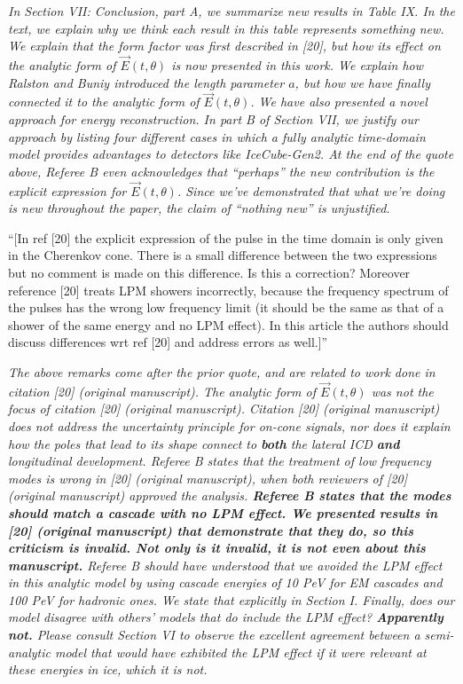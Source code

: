 \documentclass[12pt]{article}
\begin{document}
\textit{In Section VII: Conclusion, part A, we summarize new results in Table IX.  In the text, we explain why we think each result in this table represents something new.  We explain that the form factor was first described in [20], but how its effect on the analytic form of $\vec{E}(t,\theta)$ is now presented in this work.  We explain how Ralston and Buniy introduced the length parameter $a$, but how we have finally connected it to the analytic form of $\vec{E}(t,\theta)$. We have also presented a novel approach for energy reconstruction.  In part B of Section VII, we justify our approach by listing four different cases in which a fully analytic time-domain model provides advantages to detectors like IceCube-Gen2.  At the end of the quote above, Referee B even acknowledges that ``perhaps'' the new contribution is the explicit expression for $\vec{E}(t,\theta)$.  Since we've demonstrated that what we're doing is new throughout the paper, the claim of ``nothing new'' is unjustified.}

``[In ref [20] the explicit expression of the pulse in the time domain is only given in the Cherenkov cone. There is a small difference between the two expressions but no comment is made on this difference.  Is this a correction? Moreover reference [20] treats LPM showers incorrectly, because the frequency spectrum of the pulses has the wrong low frequency limit (it should be the same as that of a shower of the same energy and no LPM effect). In this article the authors should discuss differences wrt ref [20] and address errors as well.]''

\textit{The above remarks come after the prior quote, and are related to work done in citation [20] (original manuscript).  The analytic form of $\vec{E}(t,\theta)$ was not the focus of citation [20] (original manuscript).  Citation [20] (original manuscript) does not address the uncertainty principle for on-cone signals, nor does it explain how the poles that lead to its shape connect to \textbf{both} the lateral ICD \textbf{and} longitudinal development.  Referee B states that the treatment of low frequency modes is wrong in [20] (original manuscript), when both reviewers of [20] (original manuscript) approved the analysis.  \textbf{Referee B states that the modes should match a cascade with no LPM effect.  We presented results in [20] (original manuscript) that demonstrate that they do, so this criticism is invalid.  Not only is it invalid, it is not even about this manuscript.}  Referee B should have understood that we avoided the LPM effect in this analytic model by using cascade energies of 10 PeV for EM cascades and 100 PeV for hadronic ones.  We state that explicitly in Section I.  Finally, does our model disagree with others' models that do include the LPM effect? \textbf{Apparently not.}  Please consult Section VI to observe the excellent agreement between a semi-analytic model that would have exhibited the LPM effect if it were relevant at these energies in ice, which it is not.}
\end{document}
